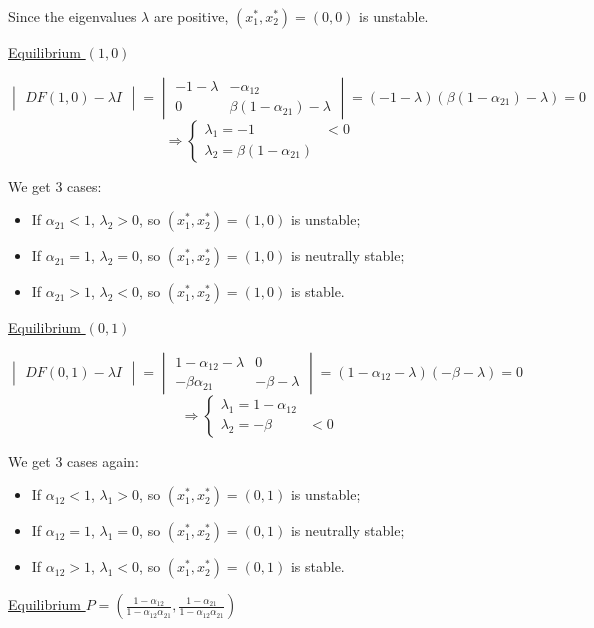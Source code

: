 \documentclass[11pt,a4paper]{scrartcl}
\theoremstyle{definition}
\begin{document}
Since the eigenvalues $\lambda$ are positive, $(x_1^{*}, x_2^{*})=(0,0)$ is unstable.

\vspace{1em}
\underline{Equilibrium $(1, 0)$}

\begin{center}
$\begin{vmatrix}
	DF(1,0)-\lambda I
\end{vmatrix}=\begin{vmatrix}
	-1-\lambda & -\alpha_{12} \\
	0 & \beta(1-\alpha_{21}) - \lambda
\end{vmatrix}=(-1-\lambda)(\beta(1-\alpha_{21})-\lambda)=0$ \[ \Rightarrow \left\{ \begin{array}{ll}
         \lambda_1=-1 & \mbox{$<0$}\\
        \lambda_2=\beta(1-\alpha_{21}) \end{array} \right. \] 
\end{center}

We get 3 cases:
\begin{itemize}
\item If $\alpha_{21}<1$, $\lambda_2>0$, so $(x_1^{*}, x_2^{*})=(1, 0)$ is unstable;
\item If $\alpha_{21}=1$, $\lambda_2=0$, so $(x_1^{*}, x_2^{*})=(1, 0)$ is neutrally stable;
\item If $\alpha_{21}>1$, $\lambda_2<0$, so $(x_1^{*}, x_2^{*})=(1, 0)$ is stable.
\end{itemize}

\vspace{1em}
\underline{Equilibrium $(0, 1)$}

\begin{center}
$\begin{vmatrix}
	DF(0,1)-\lambda I
\end{vmatrix}=\begin{vmatrix}
	1-\alpha_{12}-\lambda & 0 \\
	-\beta \alpha_{21} & -\beta - \lambda
\end{vmatrix}=(1-\alpha_{12}-\lambda)(-\beta-\lambda)=0$ \[ \Rightarrow \left\{ \begin{array}{ll}
         \lambda_1=1-\alpha_{12}\\
        \lambda_2=-\beta & \mbox{$<0$} \end{array} \right. \] 
\end{center}

We get 3 cases again:
\begin{itemize}
\item If $\alpha_{12}<1$, $\lambda_1>0$, so $(x_1^{*}, x_2^{*})=(0, 1)$ is unstable;
\item If $\alpha_{12}=1$, $\lambda_1=0$, so $(x_1^{*}, x_2^{*})=(0, 1)$ is neutrally stable;
\item If $\alpha_{12}>1$, $\lambda_1<0$, so $(x_1^{*}, x_2^{*})=(0, 1)$ is stable.
\end{itemize}
\vspace{1em}
\newpage
\underline{Equilibrium $P=(\frac{1-\alpha_{12}}{1-\alpha_{12}\alpha_{21}}, \frac{1-\alpha_{21}}{1-\alpha_{12}\alpha_{21}})$}
\end{document}
